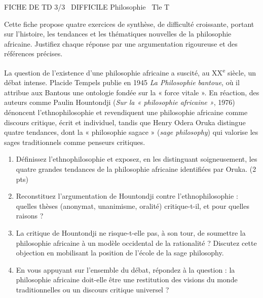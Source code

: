 \documentclass[11pt]{article}
\begin{document}
\begin{tcolorbox}[enhanced,colback=popink,colframe=popink,arc=10pt,boxrule=0pt,left=12pt,right=12pt,top=9pt,bottom=9pt]
{\color{white}\popxbold\small FICHE DE TD 3/3 \textbullet\ DIFFICILE \hfill Philosophie \textbullet\ Tle T\par}
\end{tcolorbox}
\vspace{4pt}
Cette fiche propose quatre exercices de synthèse, de difficulté croissante, portant sur l'histoire, les tendances et les thématiques nouvelles de la philosophie africaine. Justifiez chaque réponse par une argumentation rigoureuse et des références précises.

\begin{exercice}
La question de l'existence d'une philosophie africaine a suscité, au XX\textsuperscript{e} siècle, un débat intense. Placide Tempels publie en 1945 \emph{La Philosophie bantoue}, où il attribue aux Bantous une ontologie fondée sur la « force vitale ». En réaction, des auteurs comme Paulin Hountondji (\emph{Sur la « philosophie africaine »}, 1976) dénoncent l'ethnophilosophie et revendiquent une philosophie africaine comme discours critique, écrit et individuel, tandis que Henry Odera Oruka distingue quatre tendances, dont la « philosophie sagace » (\emph{sage philosophy}) qui valorise les sages traditionnels comme penseurs critiques.
\begin{enumerate}
\item Définissez l'ethnophilosophie et exposez, en les distinguant soigneusement, les quatre grandes tendances de la philosophie africaine identifiées par Oruka. (2 pts)
\item Reconstituez l'argumentation de Hountondji contre l'ethnophilosophie : quelles thèses (anonymat, unanimisme, oralité) critique-t-il, et pour quelles raisons ?
\item La critique de Hountondji ne risque-t-elle pas, à son tour, de soumettre la philosophie africaine à un modèle occidental de la rationalité ? Discutez cette objection en mobilisant la position de l'école de la sage philosophy.
\item En vous appuyant sur l'ensemble du débat, répondez à la question : la philosophie africaine doit-elle être une restitution des visions du monde traditionnelles ou un discours critique universel ?
\end{enumerate}
\end{exercice}
\end{document}
